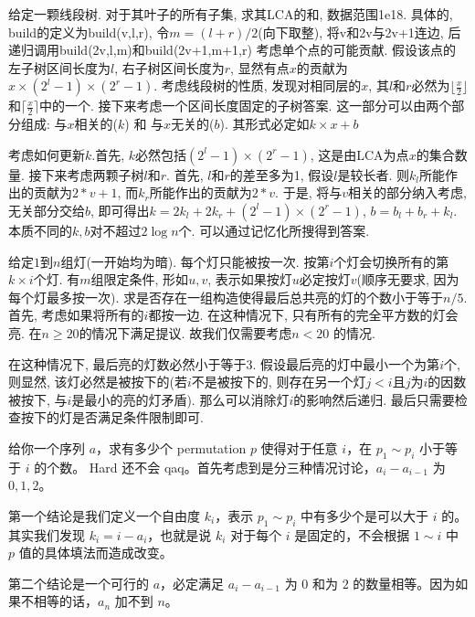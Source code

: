 \prob 给定一颗线段树. 对于其叶子的所有子集, 求其LCA的和, 数据范围1e18. 具体的, build的定义为build(v,l,r), 令$m = (l+r)/2$(向下取整), 将v和2v与2v+1连边, 后递归调用build(2v,l,m)和build(2v+1,m+1,r)
\sol  考虑单个点的可能贡献. 假设该点的左子树区间长度为$l$, 右子树区间长度为$r$, 显然有点$x$的贡献为$x \times (2^l - 1) \times (2^r - 1)$. 考虑线段树的性质, 发现对相同层的$x$, 其$l$和$r$必然为$\lfloor{\frac{x}{2}}\rfloor$和$\lceil{\frac{x}{2}}\rceil$中的一个. 接下来考虑一个区间长度固定的子树答案. 这一部分可以由两个部分组成: 与$x$相关的($k$) 和 与$x$无关的($b$). 其形式必定如$k\times x + b$

考虑如何更新$k$.首先, $k$必然包括$(2^l-1) \times (2^r - 1)$, 这是由LCA为点$x$的集合数量. 接下来考虑两颗子树$l$和$r$. 首先, $l$和$r$的差至多为1, 假设$l$是较长者. 则$k_l$所能作出的贡献为$2 * v + 1$, 而$k_r$所能作出的贡献为$2 * v$. 于是, 将与$v$相关的部分纳入考虑, 无关部分交给$b$, 即可得出$k = 2k_l + 2k_r + (2^{l}-1) \times (2^{r} - 1)$, $b = b_l + b_r + k_l$. 本质不同的$k,b$对不超过$2\log{n}$个. 可以通过记忆化所搜得到答案.

\prob 给定$1$到$n$组灯(一开始均为暗). 每个灯只能被按一次. 按第$i$个灯会切换所有的第$k \times i$个灯. 有$m$组限定条件, 形如$u, v$, 表示如果按灯$u$必定按灯$v$(顺序无要求, 因为每个灯最多按一次). 求是否存在一组构造使得最后总共亮的灯的个数小于等于$n / 5$.
\sol 首先, 考虑如果将所有的$i$都按一边. 在这种情况下, 只有所有的完全平方数的灯会亮. 在$n \geq 20$的情况下满足提议. 故我们仅需要考虑$n < 20$ 的情况.

在这种情况下, 最后亮的灯数必然小于等于$3$. 假设最后亮的灯中最小一个为第$i$个, 则显然, 该灯必然是被按下的(若$i$不是被按下的, 则存在另一个灯$j < i$且$j$为$i$的因数被按下, 与$i$是最小的亮的灯矛盾). 那么可以消除灯$i$的影响然后递归. 最后只需要检查按下的灯是否满足条件限制即可.

\prob 给你一个序列 $a$，求有多少个 permutation $p$ 使得对于任意 $i$，在 $p_1\sim p_i$ 小于等于 $i$ 的个数。
\sol Hard 还不会 qaq。首先考虑到是分三种情况讨论，$a_i-a_{i-1}$ 为 $0, 1, 2$。

第一个结论是我们定义一个自由度 $k_i$，表示 $p_1\sim p_i$ 中有多少个是可以大于 $i$ 的。其实我们发现 $k_i=i-a_i$，也就是说 $k_i$ 对于每个 $i$ 是固定的，不会根据 $1\sim i$ 中 $p$ 值的具体填法而造成改变。

第二个结论是一个可行的 $a$，必定满足 $a_i-a_{i-1}$ 为 $0$ 和为 $2$ 的数量相等。因为如果不相等的话，$a_n$ 加不到 $n$。

